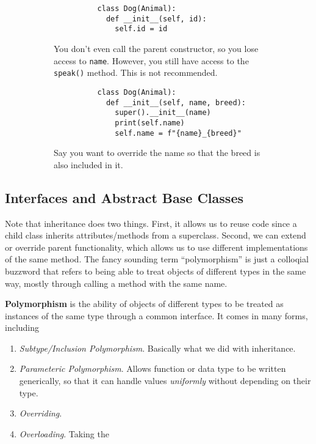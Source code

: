 \begin{example}
\begin{figure}[H]
      \begin{subfigure}[b]{0.48\textwidth}
        \centering
        \begin{lstlisting}
          class Dog(Animal): 
            def __init__(self, id): 
              self.id = id
        \end{lstlisting}
        \caption{You don't even call the parent constructor, so you lose access to \texttt{name}. However, you still have access to the \texttt{speak()} method. This is not recommended.}
      \end{subfigure}
      \hfill 
      \begin{subfigure}[b]{0.48\textwidth}
        \centering
        \begin{lstlisting}
          class Dog(Animal): 
            def __init__(self, name, breed): 
              super().__init__(name)  
              print(self.name)
              self.name = f"{name}_{breed}"
        \end{lstlisting}
        \caption{Say you want to override the name so that the breed is also included in it.}
      \end{subfigure}
      \caption{}
    \end{figure}
  \end{example}

\subsection{Interfaces and Abstract Base Classes} 

  Note that inheritance does two things. First, it allows us to reuse code since a child class inherits attributes/methods from a superclass. Second, we can extend or override parent functionality, which allows us to use different implementations of the same method. The fancy sounding term ``polymorphism'' is just a colloqial buzzword that refers to being able to treat objects of different types in the same way, mostly through calling a method with the same name. 

  \begin{definition}[Polymorphism]
    \textbf{Polymorphism} is the ability of objects of different types to be treated as instances of the same type through a common interface. It comes in many forms, including 
    \begin{enumerate}
      \item \textit{Subtype/Inclusion Polymorphism}. Basically what we did with inheritance. 
      \item \textit{Parameteric Polymorphism}. Allows function or data type to be written generically, so that it can handle values \textit{uniformly} without depending on their type. 
      \item \textit{Overriding}. 
      \item \textit{Overloading}. Taking the 
    \end{enumerate}
  \end{definition}

